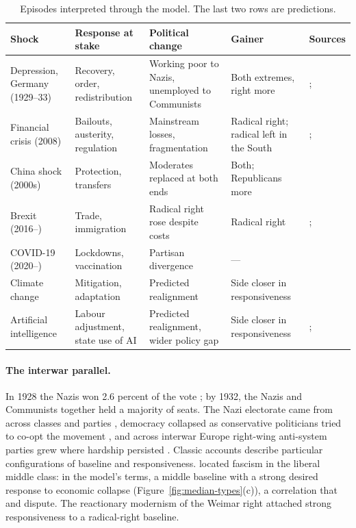 \documentclass[12pt,letterpaper]{article}
\renewcommand{\arraystretch}{0.75}
\begin{document}
\begin{table}[t]
\centering
\small
\renewcommand{\arraystretch}{1.3}
\begin{tabular}{@{}L{2.6cm}L{3.0cm}L{3.6cm}L{2.6cm}L{2.8cm}@{}}
\toprule
{\bfseries\boldmath Shock} & {\bfseries\boldmath Response at stake} & {\bfseries\boldmath Political change} & {\bfseries\boldmath Gainer} & {\bfseries\boldmath Sources} \\
\hline\hline
Depression, Germany (1929--33) & Recovery, order, redistribution & Working poor to Nazis, unemployed to Communists & Both extremes, right more & \citet{King2008}; \citet{Hamilton1982} \\ \midrule
Financial crisis (2008) & Bailouts, austerity, regulation & Mainstream losses, fragmentation & Radical right; radical left in the South & \citet{Funke2016}; \citet{Hernandez2016} \\ \midrule
China shock (2000s) & Protection, transfers & Moderates replaced at both ends & Both; Republicans more & \citet{Autor2020} \\ \midrule
Brexit (2016--) & Trade, immigration & Radical right rose despite costs & Radical right & \citet{BornEtAl2019}; \citet{Curtice2025} \\ \midrule
COVID-19 (2020--) & Lockdowns, vaccination & Partisan divergence & --- & \citet{Allcott2020} \\ \midrule
Climate change & Mitigation, adaptation & Predicted realignment & Side closer in responsiveness & \citet{IPCC2023} \\ \midrule
Artificial intelligence & Labour adjustment, state use of AI & Predicted realignment, wider policy gap & Side closer in responsiveness & \citet{Eloundou2024}; \citet{Engstrom2020} \\
\bottomrule
\end{tabular}
\caption{Episodes interpreted through the model. The last two rows are predictions.}
\label{tab:episodes}
\end{table}

\paragraph{The interwar parallel.}
In 1928 the Nazis won 2.6 percent of the vote \citep{Evans2003}; by 1932, the Nazis and Communists together held a majority of seats. The Nazi electorate came from across classes and parties \citep{Hamilton1982,Childers1983,Falter1991}, democracy collapsed as conservative politicians tried to co-opt the movement \citep{Hett2018}, and across interwar Europe right-wing anti-system parties grew where hardship persisted \citep{deBromhead2013}. Classic accounts describe particular configurations of baseline and responsiveness. \citet{Lipset1960} located fascism in the liberal middle class: in the model's terms, a middle baseline with a strong desired response to economic collapse (Figure~\ref{fig:median-types}(c)), a correlation that \citet{Hamilton1982} and \citet{Childers1983} dispute. The reactionary modernism of the Weimar right \citep{Herf1984} attached strong responsiveness to a radical-right baseline.
\end{document}
